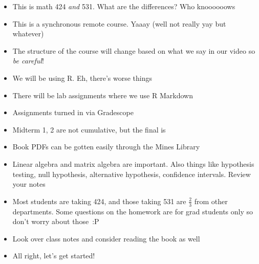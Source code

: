 \documentclass{article}
\begin{document}
  \begin{itemize}
    \item This is math 424 \textit{and} 531. What are the differences? Who knoooooows
    \item This is a synchronous remote course. Yaaay (well not really yay but whatever)
    \item The structure of the course will change based on what we say in our video so \textit{be careful}!
    \item We will be using R. Eh, there's worse things
    \item There will be lab assignments where we use R Markdown
    \item Assignments turned in via Gradescope
    \item Midterm 1, 2 are not cumulative, but the final is
    \item Book PDFs can be gotten easily through the Mines Library
    \item Linear algebra and matrix algebra are important. Also things like hypothesis testing, null hypothesis, alternative hypothesis, confidence intervals. Review your notes
    \item Most students are taking 424, and those taking 531 are $ \frac{2}{3} $ from other departments. Some questions on the homework are for grad students only so don't worry about those~:P
    \item Look over class notes and consider reading the book as well
    \item All right, let's get started!
  \end{itemize}
\end{document}
